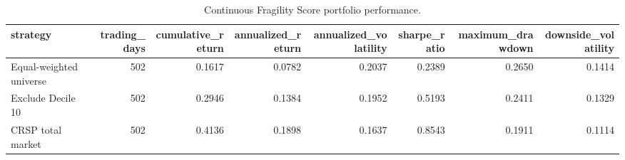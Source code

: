 \begin{table}
\caption{Continuous Fragility Score portfolio performance.}
\label{tab:fragility-strategy-performance}
\begin{tabular}{lrrrrrrr}
\toprule
strategy & trading_days & cumulative_return & annualized_return & annualized_volatility & sharpe_ratio & maximum_drawdown & downside_volatility \\
\midrule
Equal-weighted universe & 502 & 0.1617 & 0.0782 & 0.2037 & 0.2389 & 0.2650 & 0.1414 \\
Exclude Decile 10 & 502 & 0.2946 & 0.1384 & 0.1952 & 0.5193 & 0.2411 & 0.1329 \\
CRSP total market & 502 & 0.4136 & 0.1898 & 0.1637 & 0.8543 & 0.1911 & 0.1114 \\
\bottomrule
\end{tabular}
\end{table}
